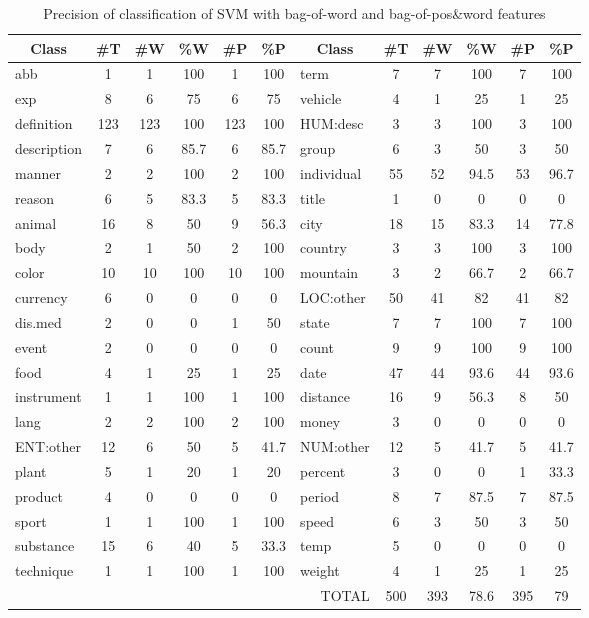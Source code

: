\documentclass[english]{jnlp_1.4}
\begin{document}
\begin{table}[b]
\centering \caption{Precision of classification of SVM with
bag-of-word and bag-of-pos\&word features}
\label{precisionwithfeatures}
\begin{tabular}{|l|c|c|c|c|c|l|c|c|c|c|c|}
\hline
\multicolumn{1}{|c|}{Class} & \#T & \#W & \%W & \#P & \%P & \multicolumn{1}{|c|}{Class} & \#T & \#W & \%W& \#P & \%P \\
\hline
abb & 1 & 1 & 100 & 1 & 100 & term &  7 &  7 &  100 & 7 & 100 \\
exp & 8 & 6 & 75 & 6 & 75 & vehicle &  4 &  1 &  25 & 1 & 25 \\
definition & 123 & 123 & 100 & 123 & 100 & HUM:desc & 3 &  3 &  100 & 3 & 100 \\
description & 7 & 6 & 85.7 & 6 & 85.7 & group &  6 &  3 &  50 & 3 & 50 \\
manner & 2 & 2 & 100 & 2 & 100 & individual &  55 &  52 &  94.5 & 53 & 96.7 \\
reason & 6 & 5 & 83.3 & 5 & 83.3 & title  &  1 &  0 &  0 & 0 & 0 \\
animal & 16 & 8 & 50 & 9 & 56.3 & city &  18 &  15 &  83.3 & 14 & 77.8 \\
body & 2 & 1 & 50 & 2 & 100 & country &  3 &  3 &  100 & 3 & 100 \\
color & 10 & 10 & 100 & 10 & 100 & mountain &  3 &  2 &  66.7 & 2 & 66.7 \\
currency & 6 & 0 & 0 & 0 & 0 & LOC:other &  50 &  41 &  82 & 41 & 82 \\
dis.med & 2 & 0 & 0 & 1 & 50 & state &  7 &  7 &  100 & 7 & 100 \\
event & 2 & 0 &  0 & 0 &  0 & count &  9 &  9 &  100 & 9 & 100 \\
food & 4 & 1 & 25 & 1 & 25 & date &  47 &  44 &  93.6 & 44 & 93.6 \\
instrument & 1 & 1 & 100 & 1 & 100 & distance &  16 & 9 & 56.3 & 8 & 50 \\
lang & 2 & 2 & 100 & 2 & 100 & money &  3 &  0 &  0 & 0 & 0 \\
ENT:other & 12 & 6 & 50 & 5 & 41.7 & NUM:other &  12 &  5 &  41.7 & 5 & 41.7 \\
plant & 5 & 1 & 20 & 1 & 20 & percent & 3 &  0 &  0 & 1 & 33.3 \\
product & 4 & 0 &  0 & 0 &  0 & period &  8 &  7 &  87.5 & 7 & 87.5  \\
sport & 1 & 1 & 100 & 1 & 100 & speed &  6 &  3 &  50 & 3 & 50 \\
substance & 15 & 6 & 40 & 5 & 33.3 & temp &  5 &  0 &  0 & 0 & 0 \\
technique & 1 & 1 & 100 & 1 & 100 & weight & 4 &  1 &  25 & 1 & 25 \\
\hline
\multicolumn{7}{|r|}{TOTAL} & 500 &  393 &  78.6 & 395 & 79 \\
\hline
\end{tabular}
\end{table}
\end{document}
